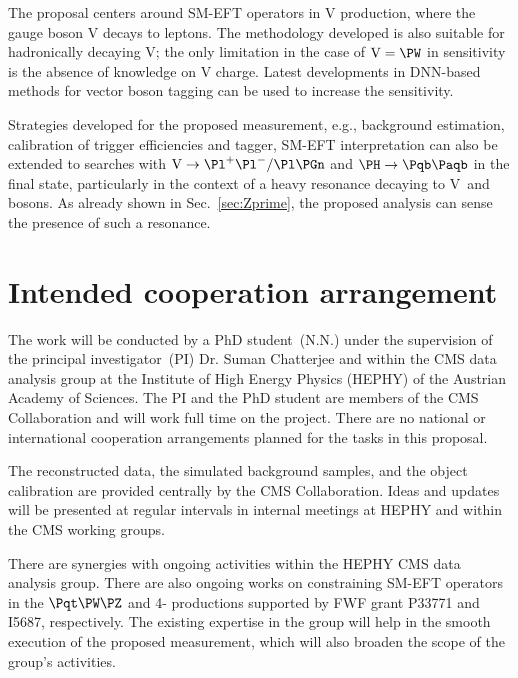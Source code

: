 \documentclass[a4paper,11pt]{article}
\newcommand{\Pb}{{{\Pqb}}\xspace}
\newcommand{\Pt}{{{\Pqt}}\xspace}
\newcommand{\PAb}{{{{\Paqb}}}\xspace}
\newcommand{\PAt}{{{{\Paqt}}}\xspace}
\renewcommand{\PV}{{{{V}}}\xspace}
\newcommand{\VH}{{{\PV}{\PH}}\xspace}
\begin{document}
The proposal centers around SM-EFT operators in \VH production, where the gauge boson \PV decays to leptons. 
The methodology developed is also suitable for hadronically decaying \PV; 
the only limitation in the case of $\textrm{\PV}={\PW}$ in sensitivity is the absence of knowledge on \PV charge. 
Latest developments in DNN-based methods for vector boson tagging can be used to increase the sensitivity. 

Strategies developed for the proposed measurement, e.g., background estimation, calibration of trigger efficiencies and \PH tagger, SM-EFT interpretation can also be extended to searches with $\textrm{\PV}\rightarrow \Pl^{+}\Pl^{-} / \Pl \Pgn$ and $\PH \to \Pb \PAb$ in the final state, particularly in the context of a heavy resonance decaying to \PV~and~{\PH} bosons. 
As already shown in Sec.~\ref{sec:Zprime}, the proposed analysis can sense the presence of such a resonance. 


\section{Intended cooperation arrangement} 

The work will be conducted by a PhD student~(N.N.) under the supervision of the principal investigator~(PI) Dr. Suman Chatterjee and within the  CMS data analysis group at the Institute of High Energy Physics (HEPHY) of the Austrian Academy of Sciences. The PI and the PhD student are members of the CMS Collaboration and will work full time on the project. 
There are no national or international cooperation arrangements planned for the tasks in this proposal.

The reconstructed data, the simulated background samples, and the object calibration are provided centrally by the CMS Collaboration. 
Ideas and updates will be presented at regular intervals in internal meetings at HEPHY and within the CMS working groups. 

There are synergies with ongoing activities within the HEPHY CMS data analysis group.
There are also ongoing works on constraining SM-EFT operators in the $\Pt\PW\PZ$ and 4-\Pt productions supported by FWF grant P33771 and I5687, respectively. 
The existing expertise in the group will help in the smooth execution of the proposed measurement, which will also broaden the scope of the group's activities.
\end{document}
